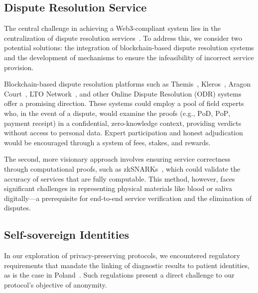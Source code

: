 \documentclass[pdftex,twocolumn,epjc3]{svjour3}
\begin{document}
\subsection{Dispute Resolution Service}\label{sec:decentralised-justice}

\begin{sloppypar}
The central challenge in achieving a Web3-compliant system lies in the centralization of dispute resolution services~\cite{ethereumWhatWeb3Why2023}. To address this, we consider two potential solutions: the integration of blockchain-based dispute resolution systems and the development of mechanisms to ensure the infeasibility of incorrect service provision.
\end{sloppypar}

Blockchain-based dispute resolution platforms such as Themis~\cite{mengThemisDecentralizedEscrow2019}, Kleros~\cite{bergollaKlerosSociolegalCase2022, gudkovCrowdArbitrationBlockchain2020}, Aragon Court~\cite{aragonDecentralizedDisputeResolution}, LTO Network~\cite{ltonetworkNextGenBlockchainB2B}, and other Online Dispute Resolution (ODR) systems~\cite{allenGovernanceBlockchainDispute2019} offer a promising direction. These systems could employ a pool of field experts who, in the event of a dispute, would examine the proofs (e.g., $\mathrm{PoD}$, $\mathrm{PoP}$, payment $\mathrm{receipt}$) in a confidential, zero-knowledge context, providing verdicts without access to personal data. Expert participation and honest adjudication would be encouraged through a system of fees, stakes, and rewards.

The second, more visionary approach involves ensuring service correctness through computational proofs, such as zkSNARKs~\cite{ben-sassonSNARKsVerifyingProgram2013}, which could validate the accuracy of services that are fully computable. This method, however, faces significant challenges in representing physical materials like blood or saliva digitally—a prerequisite for end-to-end service verification and the elimination of disputes.

\subsection{Self-sovereign Identities}
In our exploration of privacy-preserving protocols, we encountered regulatory requirements that mandate the linking of diagnostic results to patient identities, as is the case in Poland~\cite{ministerstwozdrowiaRegulationMinisterHealth2006}. Such regulations present a direct challenge to our protocol's objective of anonymity.
\end{document}
